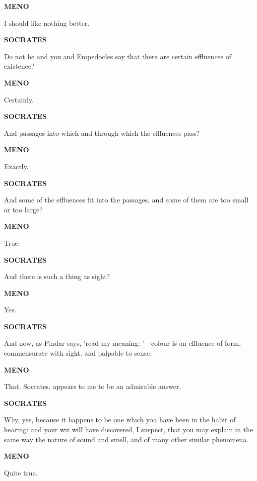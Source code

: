 \documentclass[11pt,letter]{article}
\begin{document}
\par \textbf{MENO}
\par   I should like nothing better.

\par \textbf{SOCRATES}
\par   Do not he and you and Empedocles say that there are certain effluences of existence?

\par \textbf{MENO}
\par   Certainly.

\par \textbf{SOCRATES}
\par   And passages into which and through which the effluences pass?

\par \textbf{MENO}
\par   Exactly.

\par \textbf{SOCRATES}
\par   And some of the effluences fit into the passages, and some of them are too small or too large?

\par \textbf{MENO}
\par   True.

\par \textbf{SOCRATES}
\par   And there is such a thing as sight?

\par \textbf{MENO}
\par   Yes.

\par \textbf{SOCRATES}
\par   And now, as Pindar says, 'read my meaning: '—colour is an effluence of form, commensurate with sight, and palpable to sense.

\par \textbf{MENO}
\par   That, Socrates, appears to me to be an admirable answer.

\par \textbf{SOCRATES}
\par   Why, yes, because it happens to be one which you have been in the habit of hearing:  and your wit will have discovered, I suspect, that you may explain in the same way the nature of sound and smell, and of many other similar phenomena.

\par \textbf{MENO}
\par   Quite true.
\end{document}
